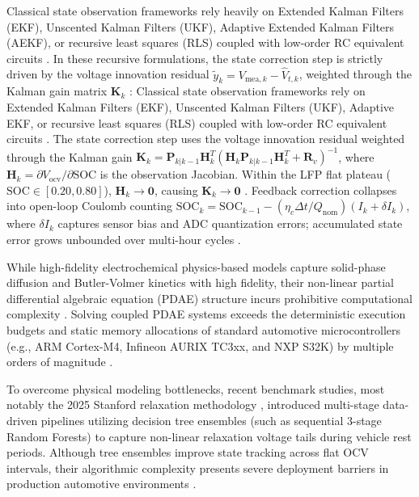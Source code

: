 Classical state observation frameworks rely heavily on Extended Kalman Filters (EKF), Unscented Kalman Filters (UKF), Adaptive Extended Kalman Filters (AEKF), or recursive least squares (RLS) coupled with low-order RC equivalent circuits \cite{plett2004extended, xiong2018towards, wei2022future, hou2026online, fan2025state}. In these recursive formulations, the state correction step is strictly driven by the voltage innovation residual $\tilde{y}_k = V_{\text{mea},k} - \hat{V}_{t,k}$, weighted through the Kalman gain matrix $\mathbf{K}_k$ \cite{plett2004extended, wei2022future}:
Classical state observation frameworks rely on Extended Kalman Filters (EKF), Unscented Kalman Filters (UKF), Adaptive EKF, or recursive least squares (RLS) coupled with low-order RC equivalent circuits \cite{plett2004extended, xiong2018towards, wei2022future, hou2026online, fan2025state}. The state correction step uses the voltage innovation residual weighted through the Kalman gain $\mathbf{K}_k = \mathbf{P}_{k|k-1}\mathbf{H}_k^T(\mathbf{H}_k\mathbf{P}_{k|k-1}\mathbf{H}_k^T + \mathbf{R}_v)^{-1}$, where $\mathbf{H}_k = \partial V_{\text{ocv}}/\partial \text{SOC}$ is the observation Jacobian. Within the LFP flat plateau ($\text{SOC} \in [0.20, 0.80]$), $\mathbf{H}_k \to \mathbf{0}$, causing $\mathbf{K}_k \to \mathbf{0}$ \cite{wei2022future, sorouri2025breaking}. Feedback correction collapses into open-loop Coulomb counting $\text{SOC}_k = \text{SOC}_{k-1} - (\eta_c \Delta t / Q_{\text{nom}})(I_k + \delta I_k)$, where $\delta I_k$ captures sensor bias and ADC quantization errors; accumulated state error grows unbounded over multi-hour cycles \cite{waag2014critical, rout2024online, dong2026secure}.

While high-fidelity electrochemical physics-based models capture solid-phase diffusion and Butler-Volmer kinetics with high fidelity, their non-linear partial differential algebraic equation (PDAE) structure incurs prohibitive computational complexity \cite{sorouri2025breaking, che2025enhanced, sorouri2026physics}. Solving coupled PDAE systems exceeds the deterministic execution budgets and static memory allocations of standard automotive microcontrollers (e.g., ARM Cortex-M4, Infineon AURIX TC3xx, and NXP S32K) by multiple orders of magnitude \cite{yahyaei2023embedded}.

To overcome physical modeling bottlenecks, recent benchmark studies, most notably the 2025 Stanford relaxation methodology \cite{che2025enhanced}, introduced multi-stage data-driven pipelines utilizing decision tree ensembles (such as sequential 3-stage Random Forests) to capture non-linear relaxation voltage tails during vehicle rest periods. Although tree ensembles improve state tracking across flat OCV intervals, their algorithmic complexity presents severe deployment barriers in production automotive environments \cite{lin2020mcunet, cui2025toward}.

